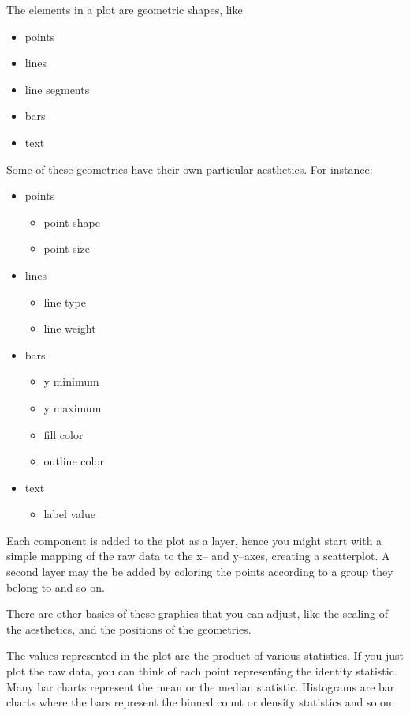 \documentclass{article}\usepackage[]{graphicx}\usepackage[usenames,dvipsnames]{color}
\begin{document}
The elements in a plot are geometric shapes, like

\begin{itemize}
   \item points
   \item lines
   \item line segments
   \item bars
   \item text
\end{itemize}

     

Some of these geometries have their own particular aesthetics. For instance:

\begin{itemize}
    \item points
\begin{itemize}
     \item point shape
     \item point size
\end{itemize}
   \item lines
\begin{itemize}
      \item  line type
      \item  line weight
\end{itemize}
   \item bars
\begin{itemize}
      \item  y minimum
      \item  y maximum
      \item  fill color
      \item  outline color
\end{itemize}
    \item text
\begin{itemize}
       \item label value
\end{itemize}

\end{itemize}

Each component is added to the plot as a layer, hence you might start with 
a simple mapping of the raw data to the x-- and y--axes, creating a scatterplot.
A second layer may the be added by coloring the points according to a
group they belong to and so on.

There are other basics of these graphics that you can adjust, 
like the scaling of the aesthetics, and the positions of the geometries.

The values represented in the plot are the product of various statistics. If you just plot the 
raw data, you can think of each point representing the identity statistic. 
Many bar charts represent the mean or the median statistic. Histograms are bar charts 
where the bars represent the binned count or density statistics and so on.
\end{document}

